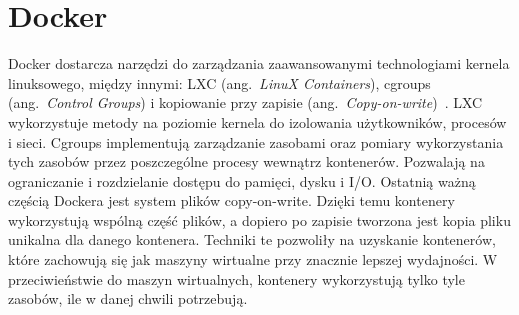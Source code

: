 \section{Docker}
	Docker dostarcza narzędzi do zarządzania zaawansowanymi technologiami kernela linuksowego, między innymi:
	LXC (ang.\ \emph{LinuX Containers}), cgroups (ang.\ \emph{Control Groups})  i kopiowanie przy zapisie (ang.\ \emph{Copy-on-write})~\cite{docker}.
	LXC wykorzystuje metody na poziomie kernela do izolowania użytkowników, procesów i sieci.
	Cgroups implementują zarządzanie zasobami oraz pomiary wykorzystania tych zasobów przez poszczególne procesy wewnątrz kontenerów.
	Pozwalają na ograniczanie i rozdzielanie dostępu do pamięci, dysku i I/O.
	Ostatnią ważną częścią Dockera jest system plików copy-on-write.
	Dzięki temu kontenery wykorzystują wspólną część plików, a dopiero po zapisie tworzona jest kopia pliku unikalna dla danego kontenera.
	Techniki te pozwoliły na uzyskanie kontenerów, które zachowują się jak maszyny wirtualne przy znacznie lepszej wydajności.
	W przeciwieństwie do maszyn wirtualnych, kontenery wykorzystują tylko tyle zasobów, ile w danej chwili potrzebują.
